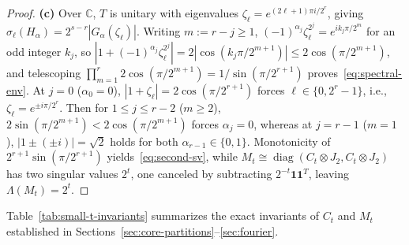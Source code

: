 \documentclass[11pt,reqno]{amsart}
\theoremstyle{definition}
\theoremstyle{remark}
\DeclareMathOperator{\diag}{diag}
\newcommand{\CC}{\mathbb{C}}
\newcommand{\ind}{\mathbf{1}}
\numberwithin{equation}{section}
\begin{document}
\begin{proof}
\medskip
\noindent\textbf{(c)} Over $\CC$, $T$ is unitary with eigenvalues $\zeta_\ell = e^{(2\ell+1)\pi i / 2^r}$, giving $\sigma_\ell(H_\alpha) = 2^{s-r}|G_\alpha(\zeta_\ell)|$. Writing $m := r - j \ge 1$, $(-1)^{\alpha_j}\zeta_\ell^{2^j} = e^{i k_j \pi / 2^m}$ for an odd integer $k_j$, so $|1 + (-1)^{\alpha_j}\zeta_\ell^{2^j}| = 2|\cos(k_j \pi / 2^{m+1})| \le 2\cos(\pi / 2^{m+1})$, and telescoping $\prod_{m=1}^r 2\cos(\pi/2^{m+1}) = 1/\sin(\pi/2^{r+1})$ proves~\eqref{eq:spectral-env}. At $j = 0$ ($\alpha_0 = 0$), $|1 + \zeta_\ell| = 2\cos(\pi/2^{r+1})$ forces $\ell \in \{0, 2^r - 1\}$, i.e., $\zeta_\ell = e^{\pm i\pi / 2^r}$. Then for $1 \le j \le r - 2$ ($m \ge 2$), $2\sin(\pi/2^{m+1}) < 2\cos(\pi/2^{m+1})$ forces $\alpha_j = 0$, whereas at $j = r - 1$ ($m = 1$), $|1 \pm (\pm i)| = \sqrt{2}$ holds for both $\alpha_{r-1} \in \{0, 1\}$. Monotonicity of $2^{r+1}\sin(\pi/2^{r+1})$ yields~\eqref{eq:second-sv}, while $M_t \cong \diag(C_t \otimes J_2, C_t \otimes J_2)$ has two singular values $2^t$, one canceled by subtracting $2^{-t}\ind\ind^T$, leaving $\Lambda(M_t) = 2^t$.
\end{proof}

Table~\ref{tab:small-t-invariants} summarizes the exact invariants of $C_t$ and $M_t$ established in Sections~\ref{sec:core-partitions}--\ref{sec:fourier}.
\end{document}
